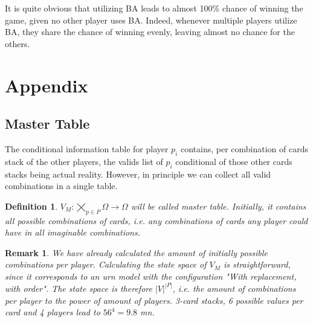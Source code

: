 \documentclass{article}
\newtheorem{definition}{Definition}[section]
\newtheorem{remark}{Remark}[section]
\begin{document}
It is quite obvious that utilizing BA leads to almost 100\% chance of winning the game, given no other player uses BA. Indeed, whenever multiple players utilize BA, they share the chance of winning evenly, leaving almost no chance for the others. 

\newpage
\appendix
\section{Appendix}

\subsection{Master Table}

The conditional information table for player $p_i$ contains, per combination of cards stack of the other players, the valids list of $p_i$ conditional of those other cards stacks being actual reality. However, in principle we can collect all valid combinations in a single table. 

\begin{definition}

$V_M : \bigtimes_{p \in P} \Omega \longrightarrow \Omega$ will be called master table. Initially, it contains all possible  combinations of cards, i.e. any combinations of cards any player could have in all imaginable combinations.

\end{definition}

\begin{remark}

We have already calculated the amount of initially possible combinations per player. Calculating the state space of $V_M$ is straightforward, since it corresponds to an urn model with the configuration "With replacement, with order". The state space is therefore  $|V|^{|P|}$, i.e. the amount of combinations per player to the power of amount of players. 3-card stacks, 6 possible values per card and 4 players lead to $56^4 = 9.8$ mn.

\end{remark}
\end{document}
